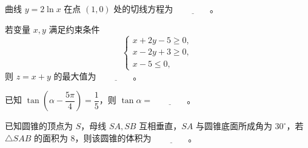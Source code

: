 \begin{question}
曲线 $y=2\ln x$ 在点 $(1,0)$ 处的切线方程为 $\underline{\qquad\qquad}$。

\end{question}
\begin{question}
若变量 $x,y$ 满足约束条件
\nopagebreak[4]
\[
\begin{cases}
x+2y-5\geqslant0,\\
x-2y+3\geqslant0,\\
x-5\leqslant0,
\end{cases}
\]
则 $z=x+y$ 的最大值为 $\underline{\qquad\qquad}$。

\end{question}
\begin{question}
已知 $\tan\left(\alpha-\dfrac{5\pi}{4}\right)=\dfrac15$，则 $\tan\alpha=\underline{\qquad\qquad}$。

\end{question}
\begin{question}
已知圆锥的顶点为 $S$，母线 $SA,SB$ 互相垂直，$SA$ 与圆锥底面所成角为 $30^\circ$，若 $\triangle SAB$ 的面积为 8，则该圆锥的体积为 $\underline{\qquad\qquad}$。

\end{question}


